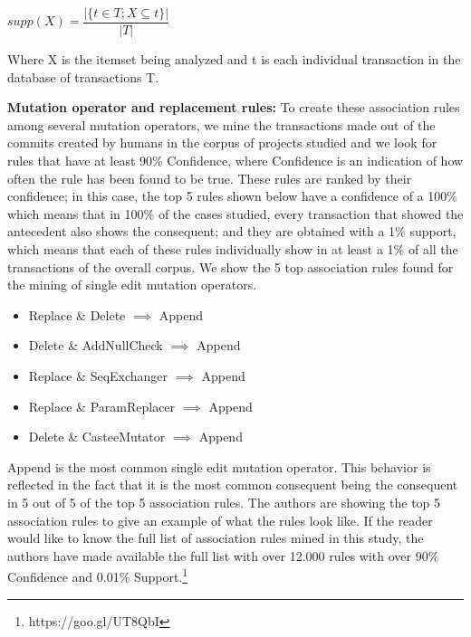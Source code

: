 \documentclass[conference]{IEEEtran}
\begin{document}
{\begin{center}
$supp(X) = \dfrac{|\{t \in T; X \subseteq t\}|}{|T|}$
\end{center}

Where X is the itemset being analyzed and t is each individual transaction in the database of transactions T. 

\textbf{Mutation operator and replacement rules:}
To create these association rules among several mutation operators, we mine the
transactions made out of the commits created by humans in the corpus of projects
studied and we look for rules that have at least 90\% Confidence, where
Confidence is an indication of how often the rule has been found to be true.  
These rules are ranked by their confidence; in this case, the top 5 rules shown
below have a confidence of a 100\% which means that in 100\% of the cases
studied, every transaction that showed the antecedent also shows the consequent;
and they are obtained with a 1\% support, which means that each of these rules
individually show in at least a 1\% of all the transactions of the overall
corpus. We show the 5  top association rules found for the mining of single edit
mutation operators. 


\begin{itemize}
\item Replace \& Delete $\implies$ Append
\item Delete \& AddNullCheck $\implies$ Append
\item Replace \& SeqExchanger $\implies$ Append
\item Replace \& ParamReplacer $\implies$ Append
\item Delete \& CasteeMutator $\implies$ Append
\end{itemize}

Append is the most common single edit mutation operator. This behavior is
reflected in the fact that it is the most common consequent being the consequent
in 5 out of 5 of the top 5 association rules. The authors are showing the top 5
association rules to give an example of what the rules look like. If the reader
would like to know the full list of association rules mined in this study, the
authors have made available the full list with over 12.000 rules with over 90\%
Confidence and 0.01\% Support.\footnote{https://goo.gl/UT8QbI} 

}
\end{document}
